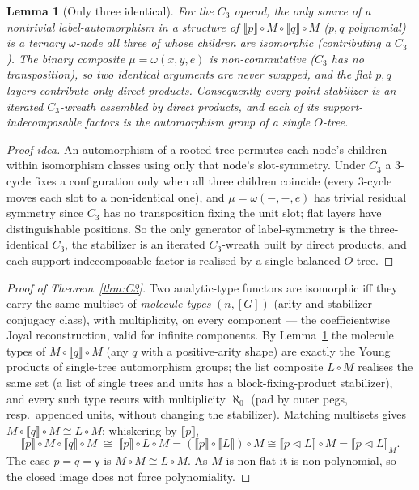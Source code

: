 \documentclass[11pt]{amsart}
\theoremstyle{plain}
\newtheorem{lemma}[theorem]{Lemma}
\theoremstyle{definition}
\newcommand{\ext}[1]{\llbracket #1 \rrbracket}
\newcommand{\extM}[1]{\llbracket #1 \rrbracket_{M}}
\newcommand{\y}{\mathsf{y}}
\begin{document}
\begin{lemma}[Only three identical]\label{lem:c3}
For the $C_3$ operad, the only source of a nontrivial label-automorphism in a structure of $\ext p\circ
M\circ\ext q\circ M$ \textup{(}$p,q$ polynomial\textup{)} is a ternary $\omega$-node all three of whose
children are isomorphic \textup{(}contributing a $C_3$\textup{)}. The binary composite $\mu=\omega(x,y,e)$
is \emph{non-commutative} \textup{(}$C_3$ has no transposition\textup{)}, so two identical arguments are
never swapped, and the flat $p,q$ layers contribute only direct products. Consequently every
point-stabilizer is an iterated $C_3$-wreath assembled by direct products, and each of its
support-indecomposable factors is the automorphism group of a single $O$-tree.
\end{lemma}

\begin{proof}[Proof idea]
An automorphism of a rooted tree permutes each node's children within isomorphism classes using only that
node's slot-symmetry. Under $C_3$ a $3$-cycle fixes a configuration only when all three children coincide
(every $3$-cycle moves each slot to a non-identical one), and $\mu=\omega(-,-,e)$ has trivial residual
symmetry since $C_3$ has no transposition fixing the unit slot; flat layers have distinguishable positions.
So the only generator of label-symmetry is the three-identical $C_3$, the stabilizer is an iterated
$C_3$-wreath built by direct products, and each support-indecomposable factor is realised by a single
balanced $O$-tree.
\end{proof}

\begin{proof}[Proof of Theorem~\ref{thm:C3}]
Two analytic-type functors are isomorphic iff they carry the same multiset of \emph{molecule types}
$(n,[G])$ (arity and stabilizer conjugacy class), with multiplicity, on every component --- the
coefficientwise Joyal reconstruction, valid for infinite components. By Lemma~\ref{lem:c3} the molecule
types of $M\circ\ext q\circ M$ (any $q$ with a positive-arity shape) are exactly the Young products of
single-tree automorphism groups; the list composite $L\circ M$ realises the same set (a list of single
trees and units has a block-fixing-product stabilizer), and every such type recurs with multiplicity
$\aleph_0$ (pad by outer pegs, resp.\ appended units, without changing the stabilizer). Matching multisets
gives $M\circ\ext q\circ M\cong L\circ M$; whiskering by $\ext p$,
\[
  \ext p\circ M\circ\ext q\circ M\;\cong\;\ext p\circ L\circ M=(\ext p\circ\ext L)\circ M\cong
  \ext{p\triangleleft L}\circ M=\extM{p\triangleleft L}.
\]
The case $p=q=\y$ is $M\circ M\cong L\circ M$. As $M$ is non-flat it is non-polynomial, so the closed
image does not force polynomiality.
\end{proof}
\end{document}
